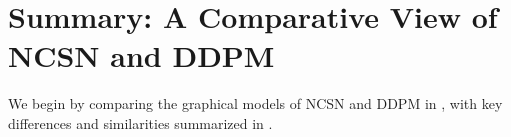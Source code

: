 


\clearpage
\newpage

\section{Summary: A Comparative View of NCSN and DDPM}

We begin by comparing the graphical models of NCSN and DDPM in , with key differences and similarities summarized in .


